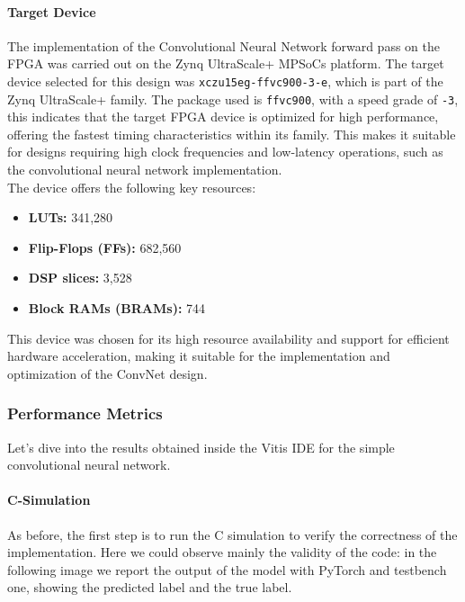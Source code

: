 \documentclass{article}
\begin{document}
\paragraph{Target Device}
The implementation of the Convolutional Neural Network forward pass on the FPGA was carried out on the Zynq UltraScale+ MPSoCs platform. The target device selected for this design was \texttt{xczu15eg-ffvc900-3-e}, which is part of the Zynq UltraScale+ family. The package used is \texttt{ffvc900}, with a speed grade of \texttt{-3}, this indicates that the target FPGA device is optimized for high performance, offering the fastest timing characteristics within its family. This makes it suitable for designs requiring high clock frequencies and low-latency operations, such as the convolutional neural network implementation.\\

The device offers the following key resources:
\begin{itemize}
    \item \textbf{LUTs:} 341,280
    \item \textbf{Flip-Flops (FFs):} 682,560
    \item \textbf{DSP slices:} 3,528
    \item \textbf{Block RAMs (BRAMs):} 744
\end{itemize}

This device was chosen for its high resource availability and support for efficient hardware acceleration, making it suitable for the implementation and optimization of the ConvNet design.


\subsubsection{Performance Metrics}
Let's dive into the results obtained inside the Vitis IDE for the simple convolutional neural network. 


\paragraph{C-Simulation}
As before, the first step is to run the C simulation to verify the correctness of the implementation. Here we could observe mainly the validity of the code: in the following image we report the output of the model with PyTorch and testbench one, showing the predicted label and the true label.
\end{document}
